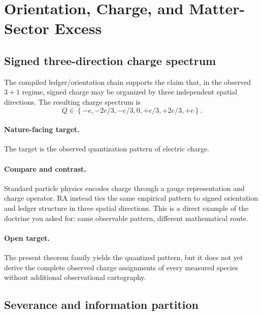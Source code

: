 \documentclass[11pt]{article}
\def\frac#1#2{#1/#2}%
\begin{document}
\section{Orientation, Charge, and Matter-Sector Excess}

\subsection{Signed three-direction charge spectrum}

The compiled ledger/orientation chain supports the claim that, in the observed $3+1$ regime, signed charge may be organized by three independent spatial directions. The resulting charge spectrum is
\begin{equation}
Q \in \left\{-e,-\frac{2e}{3},-\frac{e}{3},0,+\frac{e}{3},+\frac{2e}{3},+e\right\}.
\end{equation}

\paragraph{Nature-facing target.} The target is the observed quantization pattern of electric charge.

\paragraph{Compare and contrast.} Standard particle physics encodes charge through a gauge representation and charge operator. RA instead ties the same empirical pattern to signed orientation and ledger structure in three spatial directions. This is a direct example of the doctrine you asked for: same observable pattern, different mathematical route.

\paragraph{Open target.} The present theorem family yields the quantized pattern, but it does not yet derive the complete observed charge assignments of every measured species without additional observational cartography.

\subsection{Severance and information partition}
\end{document}
